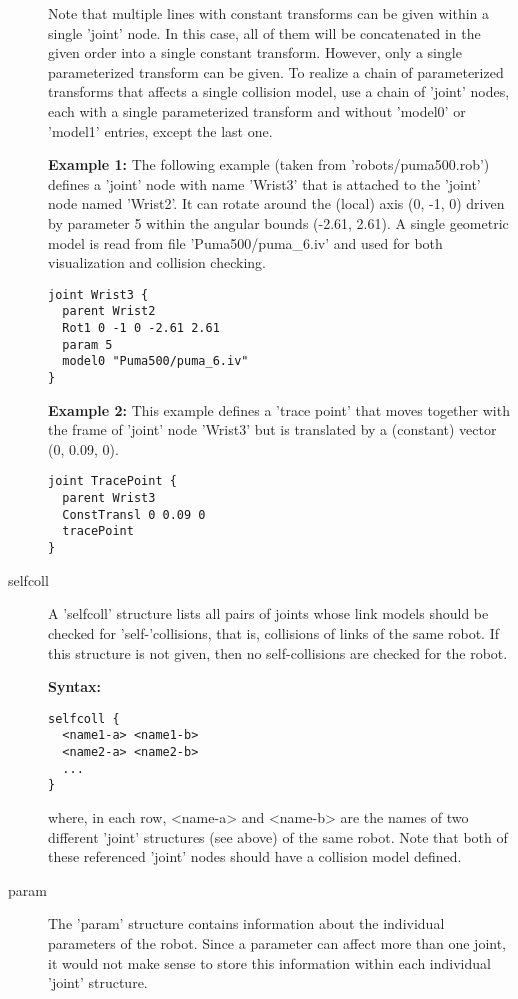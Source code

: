 \documentclass[letter,12pt]{article}
\begin{document}
\begin{description}
\begin{description}
\end{description}

Note that multiple lines with constant transforms can be given within
a single 'joint' node.  In this case, all of them will be concatenated
in the given order into a single constant transform.  However, only a
single parameterized transform can be given.  To realize a chain of
parameterized transforms that affects a single collision model, use a
chain of 'joint' nodes, each with a single parameterized transform and
without 'model0' or 'model1' entries, except the last one.

{\bf Example 1:} The following example (taken from
'robots/puma500.rob') defines a 'joint' node with name 'Wrist3' that
is attached to the 'joint' node named 'Wrist2'.  It can rotate around
the (local) axis (0, -1, 0) driven by parameter 5 within the angular
bounds (-2.61, 2.61).  A single geometric model is read from file
'Puma500/puma_6.iv' and used for both visualization and collision
checking.
\begin{verbatim}
joint Wrist3 {
  parent Wrist2
  Rot1 0 -1 0 -2.61 2.61
  param 5
  model0 "Puma500/puma_6.iv"
}
\end{verbatim}

{\bf Example 2:} This example defines a 'trace point' that moves
together with the frame of 'joint' node 'Wrist3' but is translated by
a (constant) vector (0, 0.09, 0).
\begin{verbatim}
joint TracePoint {
  parent Wrist3
  ConstTransl 0 0.09 0
  tracePoint
}
\end{verbatim}


\item[selfcoll] A 'selfcoll' structure lists all pairs of joints whose
  link models should be checked for 'self-'collisions, that is,
  collisions of links of the same robot.  If this structure is not
  given, then no self-collisions are checked for the robot.

{\bf Syntax:}
\begin{verbatim}
selfcoll {
  <name1-a> <name1-b> 
  <name2-a> <name2-b> 
  ...
}
\end{verbatim}
where, in each row, <name-a> and <name-b> are the names of two
different 'joint' structures (see above) of the same robot.  Note that
both of these referenced 'joint' nodes should have a collision model
defined.


\item[param] The 'param' structure contains information about the
  individual parameters of the robot.  Since a parameter can affect
  more than one joint, it would not make sense to store this
  information within each individual 'joint' structure.


\end{description}
\end{document}
